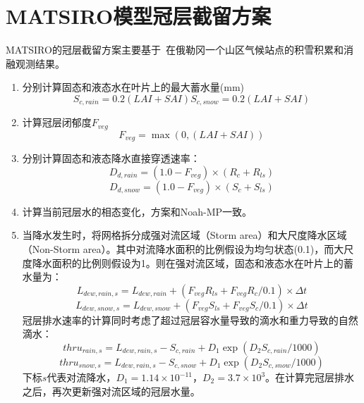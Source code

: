 \section{MATSIRO模型冠层截留方案}
MATSIRO的冠层截留方案主要基于~\cite{storck2002measurement}在俄勒冈一个山区气候站点的积雪积累和消融观测结果。
\begin{enumerate}
\item 分别计算固态和液态水在叶片上的最大蓄水量(mm)\\
\begin{equation}
S_{c,rain}=0.2\left(LAI+SAI\right)
S_{c,snow}=0.2\left(LAI+SAI\right)
\end{equation}

\item 计算冠层闭郁度$F_{veg}$
\begin{equation}
F_{veg} = \max(0, \left(LAI+SAI\right))
\end{equation}
\item 分别计算固态和液态降水直接穿透速率：
\begin{equation}
D_{d,rain}=\left(1.0-F_{veg}\right) \times (R_{c}+R_{ls})
\end{equation}
\begin{equation}
D_{d,snow}=\left(1.0-F_{veg}\right) \times (S_{c}+S_{ls})
\end{equation}
\item 计算当前冠层水的相态变化，方案和Noah-MP一致。

\item 当降水发生时，将网格拆分成强对流区域（Storm area）和大尺度降水区域（Non-Storm area）。其中对流降水面积的比例假设为均匀状态(0.1)，而大尺度降水面积的比例则假设为1。则在强对流区域，固态和液态水在叶片上的蓄水量为：
\begin{equation}
L_{dew,rain,s}=L_{dew,rain}+(F_{veg}R_{ls}+F_{veg}R_{c}/0.1)\times \Delta{t}
\end{equation}
\begin{equation}
L_{dew,snow,s}=L_{dew,snow}+(F_{veg}S_{ls}+F_{veg}S_{c}/0.1)\times \Delta{t}
\end{equation}
冠层排水速率的计算同时考虑了超过冠层容水量导致的滴水和重力导致的自然滴水：
\begin{equation}
thru_{rain,s}=L_{dew,rain,s}-S_{c,rain}+D_{1} \exp \left(D_{2} S_{c,rain}/1000\right)
\end{equation}
\begin{equation}
thru_{snow,s}=L_{dew,rain,s}-S_{c,snow}+D_{1} \exp \left(D_{2} S_{c,snow}/1000\right)
\end{equation}
下标$s$代表对流降水，$D_{1}=1.14 \times 10^{-11}$，$D_{2}=3.7 \times 10^{3}$。在计算完冠层排水之后，再次更新强对流区域的冠层水量。


\end{enumerate}
